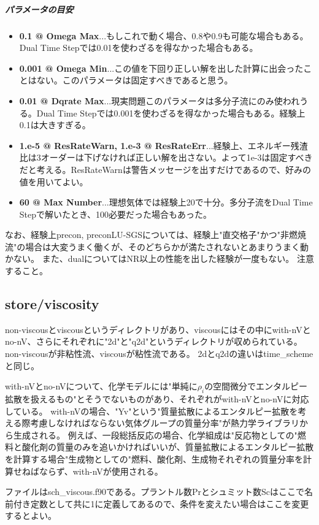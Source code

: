 \documentclass{jsarticle}
\begin{document}
\subparagraph{パラメータの目安}
\begin{itemize}
\item \textbf{0.1 @ Omega Max}...もしこれで動く場合、0.8や0.9も可能な場合もある。Dual Time Stepでは0.01を使わざるを得なかった場合もある。
\item \textbf{0.001 @ Omega Min}...この値を下回り正しい解を出した計算に出会ったことはない。このパラメータは固定すべきであると思う。
\item \textbf{0.01 @ Dqrate Max}...現実問題このパラメータは多分子流にのみ使われうる。Dual Time Stepでは0.001を使わざるを得なかった場合もある。経験上0.1は大きすぎる。
\item \textbf{1.e-5 @ ResRateWarn, 1.e-3 @ ResRateErr}...経験上、エネルギー残渣比は3オーダーは下げなければ正しい解を出さない。よって1e-3は固定すべきだと考える。ResRateWarnは警告メッセージを出すだけであるので、好みの値を用いてよい。
\item \textbf{60 @ Max Number}...理想気体では経験上20で十分。多分子流をDual Time Stepで解いたとき、100必要だった場合もあった。
\end{itemize}

\hspace{1em}

なお、経験上precon, preconLU-SGSについては、経験上"直交格子"かつ"非燃焼流"の場合は大変うまく働くが、そのどちらかが満たされないとあまりうまく動かない。
また、dualについてはNR以上の性能を出した経験が一度もない。
注意すること。
\subsection{store/viscosity}%
non-viscousとviscousというディレクトリがあり、viscousにはその中にwith-nVとno-nV、さらにそれぞれに"2d"と"q2d"というディレクトリが収められている。
non-viscousが非粘性流、viscousが粘性流である。
2dとq2dの違いはtime\_schemeと同じ。

with-nVとno-nVについて、化学モデルには"単純に$\rho_i$の空間微分でエンタルピー拡散を扱えるもの"とそうでないものがあり、それぞれがwith-nVとno-nVに対応している。
with-nVの場合、"Yv"という"質量拡散によるエンタルピー拡散を考える際考慮しなければならない気体グループの質量分率"が熱力学ライブラリから生成される。
例えば、一段総括反応の場合、化学組成は"反応物としての"燃料と酸化剤の質量のみを追いかければいいが、質量拡散によるエンタルピー拡散を計算する場合"生成物としての"燃料、酸化剤、生成物それぞれの質量分率を計算せねばならず、with-nVが使用される。

ファイルはsch\_viscous.f90である。プラントル数Prとシュミット数Scはここで名前付き定数として共に1に定義してあるので、条件を変えたい場合はここを変更するとよい。
\end{document}
